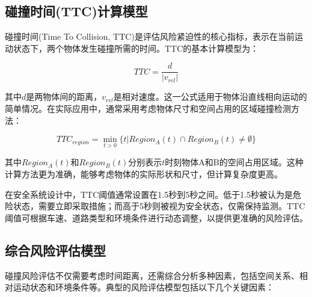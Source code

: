 \documentclass[a4paper, UTF8, fontsize=12pt]{ctexart} %
\numberwithin{equation}{section} %
\begin{document}
\subsection{碰撞时间(TTC)计算模型}

碰撞时间(Time To Collision, TTC)是评估风险紧迫性的核心指标，表示在当前运动状态下，两个物体发生碰撞所需的时间。TTC的基本计算模型为：

\begin{equation}
TTC = \frac{d}{|v_{rel}|}
\end{equation}

其中$d$是两物体间的距离，$v_{rel}$是相对速度。这一公式适用于物体沿直线相向运动的简单情况。在实际应用中，通常采用考虑物体尺寸和空间占用的区域碰撞检测方法：

\begin{equation}
TTC_{region} = \min_{t>0} \{t | Region_A(t) \cap Region_B(t) \neq \emptyset \}
\end{equation}

其中$Region_A(t)$和$Region_B(t)$分别表示$t$时刻物体A和B的空间占用区域。这种计算方法更为准确，能够考虑物体的实际形状和尺寸，但计算复杂度更高。

在安全系统设计中，TTC阈值通常设置在1.5秒到5秒之间。低于1.5秒被认为是危险状态，需要立即采取措施；而高于5秒则被视为安全状态，仅需保持监测。TTC阈值可根据车速、道路类型和环境条件进行动态调整，以提供更准确的风险评估。

\subsection{综合风险评估模型}

碰撞风险评估不仅需要考虑时间距离，还需综合分析多种因素，包括空间关系、相对运动状态和环境条件等。典型的风险评估模型包括以下几个关键因素：
\end{document}
